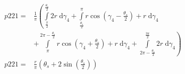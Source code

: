 \begin{align}
    p221 =&\frac{1}{\pi} \left(\int\limits_{\frac{\pi}{2}}^{\frac{\theta_{s}}{2}}2 r\;\mathrm{d}\gamma_{4}+\int\limits_{\frac{\theta_{s}}{2}}^{\pi}r \cos{\left (\gamma_{4} - \frac{\theta_{s}}{2} \right )} + r\;\mathrm{d}\gamma_{4}\right.\\
 &\left.+\int\limits_{\pi}^{2 \pi - \frac{\theta_{s}}{2}}r \cos{\left (\gamma_{4} + \frac{\theta_{s}}{2} \right )} + r\;\mathrm{d}\gamma_{4}+\int\limits_{2 \pi - \frac{\theta_{s}}{2}}^{\frac{3 \pi}{2}}2 r\;\mathrm{d}\gamma_{4}\right)\\
    p221 =& \frac{r}{\pi} \left(\theta_{s} + 2 \sin{\left (\frac{\theta_{s}}{2} \right )}\right)
\end{align}